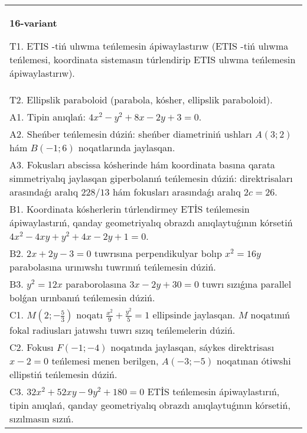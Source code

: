 \documentclass{article}
\begin{document}
\begin{tabular}{m{17cm}}
\textbf{16-variant}
\newline

T1. ETIS -tiń ulıwma teńlemesin ápiwaylastırıw (ETIS -tiń ulıwma teńlemesi, koordinata sistemasın túrlendirip ETIS ulıwma teńlemesin ápiwaylastırıw).\\

T2. Ellipslik paraboloid (parabola, kósher, ellipslik paraboloid).\\

A1. Tipin anıqlań: $4 x^{2}-y^{2}+8 x-2 y+3=0$.\\

A2. Sheńber teńlemesin dúziń: sheńber diametriniń ushları $A (3;2) $ hám $B (-1;6 ) $ noqatlarında jaylasqan.\\

A3. Fokusları abscissa kósherinde hám koordinata basına qarata simmetriyalıq jaylasqan giperbolanıń teńlemesin dúziń: direktrisaları arasındaǵı aralıq $228/13$ hám fokusları arasındaǵı aralıq $2 c=26$.\\

B1. Koordinata kósherlerin túrlendirmey ETİS teńlemesin ápiwaylastırıń, qanday geometriyalıq obrazdı anıqlaytuǵının kórsetiń $4x^{2} - 4xy + y^{2} + 4x - 2y + 1 = 0$.  \\

B2. $2x + 2y - 3 = 0$ tuwrısına perpendikulyar bolıp $x^{2} = 16y$ parabolasına urınıwshı tuwrınıń teńlemesin dúziń.  \\

B3. $y^{2} = 12x$ paraborolasına $3x - 2y + 30 = 0$ tuwrı sızıǵına parallel bolǵan urınbanıń teńlemesin dúziń.  \\

C1. $M(2; - \frac{5}{3})$ noqatı $\frac{x^{2}}{9} + \frac{y^{2}}{5} = 1$ ellipsinde jaylasqan. $M$ noqatınıń fokal radiusları jatıwshı tuwrı sızıq teńlemelerin dúziń.  \\

C2. Fokusı $F( - 1; - 4)$ noqatında jaylasqan, sáykes direktrisası $x - 2 = 0$ teńlemesi menen berilgen, $A( - 3; - 5)$ noqatınan ótiwshi ellipstiń teńlemesin dúziń.  \\

C3. $32x^{2} + 52xy - 9y^{2} + 180 = 0$ ETİS teńlemesin ápiwaylastırıń, tipin anıqlań, qanday geometriyalıq obrazdı anıqlaytuǵının kórsetiń, sızılmasın sızıń.  \\

\end{tabular}
\vspace{1cm}
\end{document}
